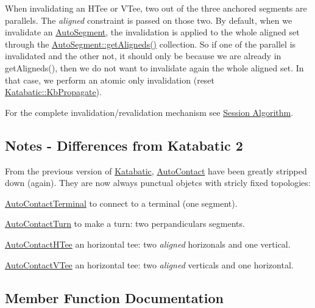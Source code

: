 When invalidating an H\+Tee or V\+Tee, two out of the three anchored segments are parallels. The {\itshape aligned} constraint is passed on those two. By default, when we invalidate an \hyperlink{classKatabatic_1_1AutoSegment}{Auto\+Segment}, the invalidation is applied to the whole aligned set through the \hyperlink{classKatabatic_1_1AutoSegment_aaca749f49cd03ca06449d5ea2104033a}{Auto\+Segment\+::get\+Aligneds()} collection. So if one of the parallel is invalidated and the other not, it should only be because we are already in {\ttfamily get\+Aligneds()}, then we do not want to invalidate again the whole aligned set. In that case, we perform an atomic only invalidation (reset \hyperlink{namespaceKatabatic_a2af2ad6b6441614038caf59d04b3b217a3f95c1f06fe0b58b44ccbc57d99f2a5d}{Katabatic\+::\+Kb\+Propagate}).

For the complete invalidation/revalidation mechanism see \hyperlink{classKatabatic_1_1Session_secSessionAlgo}{Session Algorithm}.\hypertarget{classKatabatic_1_1AutoContact_secDiffFromKatabatic2}{}\subsection{Notes -\/ Differences from Katabatic 2}\label{classKatabatic_1_1AutoContact_secDiffFromKatabatic2}
From the previous version of \hyperlink{namespaceKatabatic}{Katabatic}, \hyperlink{classKatabatic_1_1AutoContact}{Auto\+Contact} have been greatly stripped down (again). They are now always punctual objetcs with stricly fixed topologies\+: 
\begin{DoxyItemize}
\item \hyperlink{classKatabatic_1_1AutoContactTerminal}{Auto\+Contact\+Terminal} to connect to a terminal (one segment). 
\item \hyperlink{classKatabatic_1_1AutoContactTurn}{Auto\+Contact\+Turn} to make a turn\+: two perpandiculars segments. 
\item \hyperlink{classKatabatic_1_1AutoContactHTee}{Auto\+Contact\+H\+Tee} an horizontal tee\+: two {\itshape aligned} horizonals and one vertical. 
\item \hyperlink{classKatabatic_1_1AutoContactVTee}{Auto\+Contact\+V\+Tee} an horizontal tee\+: two {\itshape aligned} verticals and one horizontal. 
\end{DoxyItemize}

\subsection{Member Function Documentation}
\mbox{\label{classKatabatic_1_1AutoContact_a4092778435abf3fb25a986a802bdb6c6}} 
